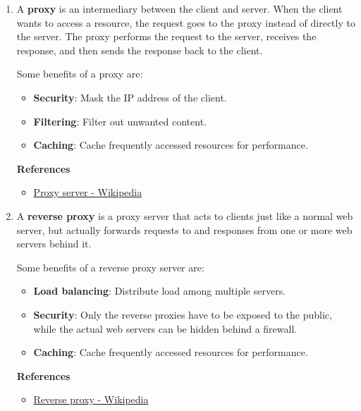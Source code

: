 \documentclass[12pt, a4paper]{article}
\begin{document}
\begin{enumerate}
    \item A \textbf{proxy} is an intermediary between the client and server. When the client
    wants to access a resource, the request goes to the proxy instead of directly to
    the server. The proxy performs the request to the server, receives the response,
    and then sends the response back to the client.

    Some benefits of a proxy are:
    \begin{itemize}
      \item \textbf{Security}: Mask the IP address of the client.
      \item \textbf{Filtering}: Filter out unwanted content.
      \item \textbf{Caching}: Cache frequently accessed resources for performance.
    \end{itemize}

    \textbf{References}
    \begin{itemize}
      \item \href{https://en.wikipedia.org/wiki/Proxy_server}{Proxy server - Wikipedia}
    \end{itemize}

    \item A \textbf{reverse proxy} is a proxy server that acts to clients just like a
    normal web server, but actually forwards requests to and responses from one or more web
    servers behind it.

    Some benefits of a reverse proxy server are:
    \begin{itemize}
      \item \textbf{Load balancing}: Distribute load among multiple servers.
      \item \textbf{Security}: Only the reverse proxies have to be exposed to the public,
      while the actual web servers can be hidden behind a firewall.
      \item \textbf{Caching}: Cache frequently accessed resources for performance.
    \end{itemize}

    \textbf{References}
    \begin{itemize}
      \item \href{https://en.wikipedia.org/wiki/Reverse_proxy}{Reverse proxy - Wikipedia}
    \end{itemize}
  \end{enumerate}

  \pagebreak
\end{document}
